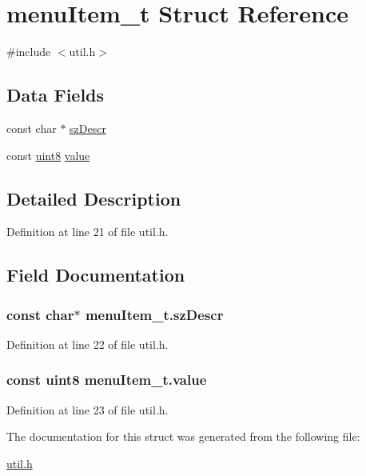 \hypertarget{structmenu_item__t}{
\section{menuItem\_\-t Struct Reference}
\label{structmenu_item__t}
}


{\ttfamily \#include $<$util.h$>$}

\subsection*{Data Fields}
\begin{DoxyCompactItemize}
\item 
const char $\ast$ \hyperlink{structmenu_item__t_aa74bcfc907d8d7d048800240a54d705c}{szDescr}
\item 
const \hyperlink{hal__types_8h_adde6aaee8457bee49c2a92621fe22b79}{uint8} \hyperlink{structmenu_item__t_aafa27df757e13288318ec0540a4f6f06}{value}
\end{DoxyCompactItemize}


\subsection{Detailed Description}


Definition at line 21 of file util.h.



\subsection{Field Documentation}
\hypertarget{structmenu_item__t_aa74bcfc907d8d7d048800240a54d705c}{
\subsubsection[{szDescr}]{\setlength{\rightskip}{0pt plus 5cm}const char$\ast$ {\bf menuItem\_\-t.szDescr}}}
\label{structmenu_item__t_aa74bcfc907d8d7d048800240a54d705c}


Definition at line 22 of file util.h.

\hypertarget{structmenu_item__t_aafa27df757e13288318ec0540a4f6f06}{
\subsubsection[{value}]{\setlength{\rightskip}{0pt plus 5cm}const {\bf uint8} {\bf menuItem\_\-t.value}}}
\label{structmenu_item__t_aafa27df757e13288318ec0540a4f6f06}


Definition at line 23 of file util.h.



The documentation for this struct was generated from the following file:\begin{DoxyCompactItemize}
\item 
\hyperlink{util_8h}{util.h}\end{DoxyCompactItemize}
